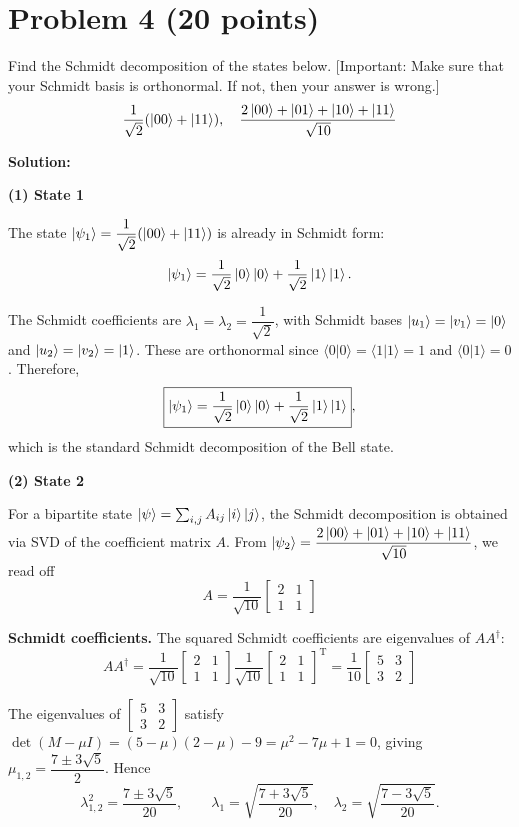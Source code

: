 \documentclass[11pt]{article}
\newenvironment{solution}
{\par\noindent\textbf{Solution:}\par}
{\vspace{1em}}
\begin{document}
\section*{Problem 4 (20 points)}
Find the Schmidt decomposition of the states below. [Important: Make sure that your Schmidt basis is orthonormal. If not, then your answer is wrong.]
\[\frac{1}{\sqrt{2}}(\ket{00} + \ket{11}), \quad \frac{2\ket{00} + \ket{01} + \ket{10} + \ket{11}}{\sqrt{10}}\]

\begin{solution}

\textbf{(1) State 1}

The state $\ket{\psi_1}=\dfrac{1}{\sqrt{2}}(\ket{00}+\ket{11})$ is already in Schmidt form:
\[
\ket{\psi_1}=\frac{1}{\sqrt{2}}\ket{0}\ket{0}+\frac{1}{\sqrt{2}}\ket{1}\ket{1}.
\]

The Schmidt coefficients are $\lambda_1=\lambda_2=\dfrac{1}{\sqrt{2}}$, with Schmidt bases $\ket{u_1}=\ket{v_1}=\ket{0}$ and $\ket{u_2}=\ket{v_2}=\ket{1}$. These are orthonormal since $\langle0|0\rangle=\langle1|1\rangle=1$ and $\langle0|1\rangle=0$. Therefore,
\[
\boxed{\ket{\psi_1}=\frac{1}{\sqrt{2}}\ket{0}\ket{0}+\frac{1}{\sqrt{2}}\ket{1}\ket{1}},
\]
which is the standard Schmidt decomposition of the Bell state.

\textbf{(2) State 2}

For a bipartite state $\ket{\psi}=\sum_{i,j}A_{ij}\ket{i}\ket{j}$, the Schmidt decomposition is obtained via SVD of the coefficient matrix $A$. From $\ket{\psi_2}=\dfrac{2\ket{00}+\ket{01}+\ket{10}+\ket{11}}{\sqrt{10}}$, we read off
\[A=\frac{1}{\sqrt{10}}\begin{bmatrix}2&1\\1&1\end{bmatrix}\]

\textbf{Schmidt coefficients.} The squared Schmidt coefficients are eigenvalues of $AA^\dagger$:
\[AA^\dagger = \frac{1}{\sqrt{10}}\begin{bmatrix}2&1\\1&1\end{bmatrix} \frac{1}{\sqrt{10}}\begin{bmatrix}2&1\\1&1\end{bmatrix}^{\mathrm{T}} = \frac{1}{10}\begin{bmatrix}5&3\\3&2\end{bmatrix}\]

The eigenvalues of $\begin{bmatrix}5&3\\3&2\end{bmatrix}$ satisfy $\det(M-\mu I)=(5-\mu)(2-\mu)-9=\mu^2-7\mu+1=0$, giving $\mu_{1,2}=\dfrac{7\pm3\sqrt5}{2}$. 
Hence
\[\lambda_{1,2}^2=\frac{7\pm3\sqrt5}{20}, \qquad \boxed{\lambda_1=\sqrt{\frac{7+3\sqrt5}{20}},\quad\lambda_2=\sqrt{\frac{7-3\sqrt5}{20}}}.\]


\end{solution}
\end{document}
